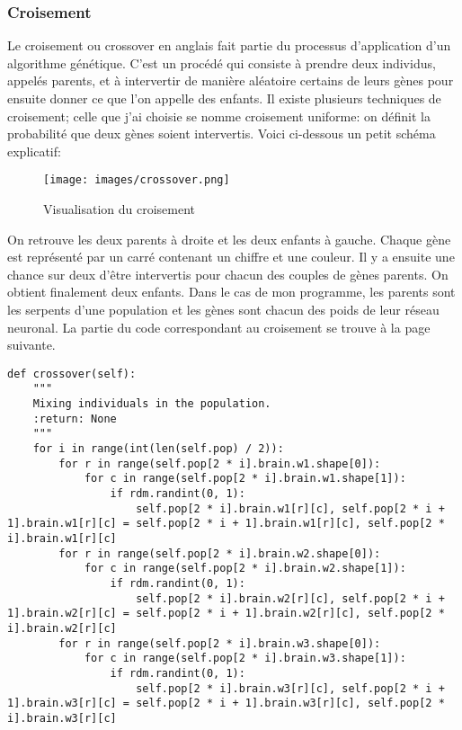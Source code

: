 \documentclass[12pt, a4paper, openany]{book}
\begin{document}
\subsubsection{Croisement}
\label{r:2.7.6-cro}
Le croisement ou \og{}crossover\fg{} en anglais fait partie du processus d'application d'un algorithme génétique. C'est un procédé qui consiste à prendre deux individus, appelés \og{}parents\fg{}, et à intervertir de manière aléatoire certains de leurs gènes pour ensuite donner ce que l'on appelle des \og{}enfants\fg{}.\newline
Il existe plusieurs techniques de croisement; celle que j'ai choisie se nomme \og{}croisement uniforme\fg{}: on définit la probabilité que deux gènes soient intervertis. Voici ci-dessous un petit schéma explicatif:
\begin{figure}[H]
    \centering
    \texttt{[image: images/crossover.png]}
    \caption{Visualisation du croisement}
\end{figure}
On retrouve les deux parents à droite et les deux enfants à gauche. Chaque gène est représenté par un carré contenant un chiffre et une couleur. Il y a ensuite une chance sur deux d'être intervertis pour chacun des couples de gènes parents. On obtient finalement deux enfants.\newline
Dans le cas de mon programme, les parents sont les serpents d'une population et les gènes sont chacun des poids de leur réseau neuronal. La partie du code correspondant au croisement se trouve à la page suivante.\newpage
\begin{verbatim}
def crossover(self):
    """
    Mixing individuals in the population.
    :return: None
    """
    for i in range(int(len(self.pop) / 2)):
        for r in range(self.pop[2 * i].brain.w1.shape[0]):
            for c in range(self.pop[2 * i].brain.w1.shape[1]):
                if rdm.randint(0, 1):
                    self.pop[2 * i].brain.w1[r][c], self.pop[2 * i + 1].brain.w1[r][c] = self.pop[2 * i + 1].brain.w1[r][c], self.pop[2 * i].brain.w1[r][c]
        for r in range(self.pop[2 * i].brain.w2.shape[0]):
            for c in range(self.pop[2 * i].brain.w2.shape[1]):
                if rdm.randint(0, 1):
                    self.pop[2 * i].brain.w2[r][c], self.pop[2 * i + 1].brain.w2[r][c] = self.pop[2 * i + 1].brain.w2[r][c], self.pop[2 * i].brain.w2[r][c]
        for r in range(self.pop[2 * i].brain.w3.shape[0]):
            for c in range(self.pop[2 * i].brain.w3.shape[1]):
                if rdm.randint(0, 1):
                    self.pop[2 * i].brain.w3[r][c], self.pop[2 * i + 1].brain.w3[r][c] = self.pop[2 * i + 1].brain.w3[r][c], self.pop[2 * i].brain.w3[r][c]
\end{verbatim}
\end{document}
